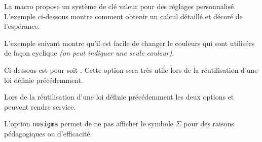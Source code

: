 \documentclass[12pt,a4paper]{article}
\begin{document}



La macro  propose un système de clé valeur pour des réglages personnalisé. L'exemple ci-dessous montre comment obtenir un calcul détaillé et décoré de l'espérance.



L'exemple suivant montre qu'il est facile de changer le couleurs qui sont utilisées de façon cyclique \emph{(on peut indiquer une seule couleur)}.






Ci-dessous  est pour  soit . Cette option sera très utile lors de la réutilisation d'une loi définie précédemment.






Lors de la réutilisation d'une loi définie précédemment les deux options  et  peuvent rendre service.






L'option \verb#nosigma# permet de ne pas afficher le symbole $\Sigma$ pour des raisons pédagogiques ou d'efficacité.

\end{document}
